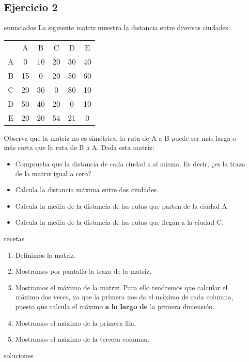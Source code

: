 \subsection{Ejercicio 2}
\def\parte{enunciados}
\ifx\capitulo\parte
La siguiente matriz muestra la distancia entre diversas ciudades:

\begin{center}
  \begin{tabular}[h]{cccccc}
    &A&B&C&D&E \\
    A&0&10&20&30&40 \\
    B&15&0&20&50&60 \\
    C&20&30&0&80&10 \\
    D&50&40&20&0&10 \\
    E&20&20&54&21&0
  \end{tabular}
\end{center}

Observa que la matriz no es simétrica, la ruta de A a B puede ser más larga o más corta que la ruta de B a A. Dada esta matriz:
\begin{itemize}
\item Comprueba que la distancia de cada ciudad a sí misma. Es decir, ¿es la traza de la matriz igual a cero?
\item Calcula la distancia máxima entre dos ciudades.
\item Calcula la media de la distancia de las rutas que parten de la ciudad A.
\item Calcula la media de la distancia de las rutas que llegan a la ciudad C.
\end{itemize}
\fi

\def\parte{recetas}
\ifx\capitulo\parte
\begin{enumerate}
\item Definimos la matriz.
\item Mostramos por pantalla la traza de la matriz.
\item Mostramos el máximo de la matriz. Para ello tendremos que calcular el máximo dos veces, ya que la primera nos da el máximo de cada columna, puesto que calcula el máximo \textbf{a lo largo de} la primera dimensión.
\item Mostramos el máximo de la primera fila.
\item Mostramos el máximo de la tercera columna.
\end{enumerate}
\fi

\def\parte{soluciones}
\ifx\capitulo\parte

\fi
